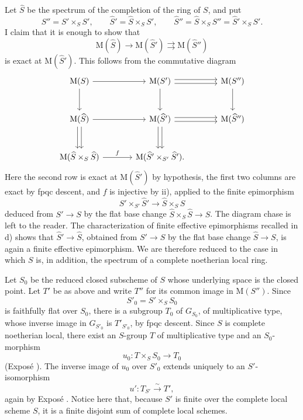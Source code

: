 Let \(\widehat S\) be the spectrum of the completion of the ring of
\(S\), and put
\[
  S''=S'\times_S S',
  \qquad
  \widehat S'=\widehat S\times_S S',
  \qquad
  \widehat S''=\widehat S\times_S S''
      =\widehat S'\times_S S'.
\]
I claim that it is enough to show that
\[
  \tag{\(\widehat *\)}\label{sga3:xv:lemma:3-9:equation:widehat-star}
  \mathrm M(\widehat S)\longrightarrow
  \mathrm M(\widehat S')
  \rightrightarrows
  \mathrm M(\widehat S'')
\]
is exact at \(\mathrm M(\widehat S')\). This follows from the
commutative diagram
\[
\begin{tikzcd}[column sep=large,row sep=large]
\mathrm M(S) \arrow[r] \arrow[d]
  & \mathrm M(S') \arrow[r,shift left=.55ex]
      \arrow[r,shift right=.55ex] \arrow[d]
  & \mathrm M(S'') \arrow[d]\\
\mathrm M(\widehat S) \arrow[r]
      \arrow[d,shift left=.55ex] \arrow[d,shift right=.55ex]
  & \mathrm M(\widehat S') \arrow[r,shift left=.55ex]
      \arrow[r,shift right=.55ex]
      \arrow[d,shift left=.55ex] \arrow[d,shift right=.55ex]
  & \mathrm M(\widehat S'')\\
\mathrm M(\widehat S\times_S\widehat S)
  \arrow[r,"f"]
  & \mathrm M(\widehat S'\times_{S'}\widehat S').
\end{tikzcd}
\]
Here the second row is exact at \(\mathrm M(\widehat S')\) by
hypothesis, the first two columns are exact by fpqc descent, and
\(f\) is injective by ii), applied to the finite epimorphism
\[
  \widehat S'\times_{S'}\widehat S'
  \longrightarrow
  \widehat S\times_S\widehat S
\]
deduced from \(S'\to S\) by the flat base change
\(\widehat S\times_S\widehat S\to S\). The diagram chase is left
to the reader. The characterization of finite effective
epimorphisms recalled in d) shows that
\(\widehat S'\to\widehat S\), obtained from \(S'\to S\) by the
flat base change \(\widehat S\to S\), is again a finite effective
epimorphism. We are therefore reduced to the case in which \(S\)
is, in addition, the spectrum of a complete noetherian local ring.

Let \(S_0\) be the reduced closed subscheme of \(S\) whose
underlying space is the closed point. Let \(T'\) be as above and
write \(T''\) for its common image in \(\mathrm M(S'')\). Since
\[
  S'_0=S'\times_S S_0
\]
is faithfully flat over \(S_0\), there is a subgroup \(T_0\) of
\(G_{S_0}\), of multiplicative type, whose inverse image in
\(G_{S'_0}\) is \(T'_{S'_0}\), by fpqc descent. Since \(S\) is
complete noetherian local, there exist an \(S\)-group \(T\) of
multiplicative type and an \(S_0\)-morphism
\[
  u_0:T\times_S S_0\longrightarrow T_0
\]
(Exposé ). The inverse image of \(u_0\) over \(S'_0\) extends
uniquely to an \(S'\)-isomorphism
\[
  u':T_{S'}\xrightarrow{\sim}T',
\]
again by Exposé . Notice here that, because \(S'\) is finite
over the complete local scheme \(S\), it is a finite disjoint sum
of complete local schemes.

